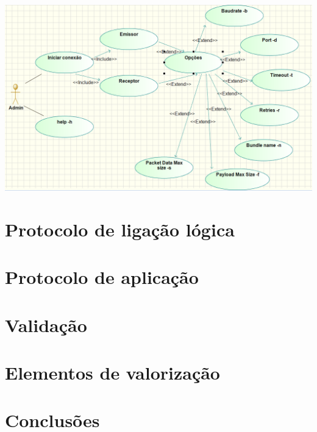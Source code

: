 \documentclass[a4paper]{article}
\begin{document}
\includegraphics[scale=0.5]{useCases.png}

\section{Protocolo de ligação lógica}

\section{Protocolo de aplicação}

\section{Validação}

\section{Elementos de valorização}

\section{Conclusões}
\end{document}
